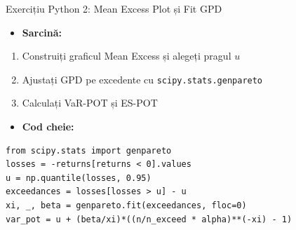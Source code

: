 \documentclass[9pt, aspectratio=169, t]{beamer}
\begin{document}
\begin{frame}[fragile]{Exercițiu Python 2: Mean Excess Plot și Fit GPD}
    \begin{itemize}\setlength{\itemsep}{0pt}
        \item \textbf{Sarcină:}
    \end{itemize}
    \begin{enumerate}\setlength{\itemsep}{0pt}
        \item Construiți graficul Mean Excess și alegeți pragul $u$
        \item Ajustați GPD pe excedente cu \texttt{scipy.stats.genpareto}
        \item Calculați VaR-POT și ES-POT
    \end{enumerate}

    \vspace{0.3cm}
    \begin{itemize}\setlength{\itemsep}{0pt}
        \item \textbf{Cod cheie:}
    \end{itemize}
    \begin{verbatim}
from scipy.stats import genpareto
losses = -returns[returns < 0].values
u = np.quantile(losses, 0.95)
exceedances = losses[losses > u] - u
xi, _, beta = genpareto.fit(exceedances, floc=0)
var_pot = u + (beta/xi)*((n/n_exceed * alpha)**(-xi) - 1)
    \end{verbatim}

\end{frame}
\end{document}
